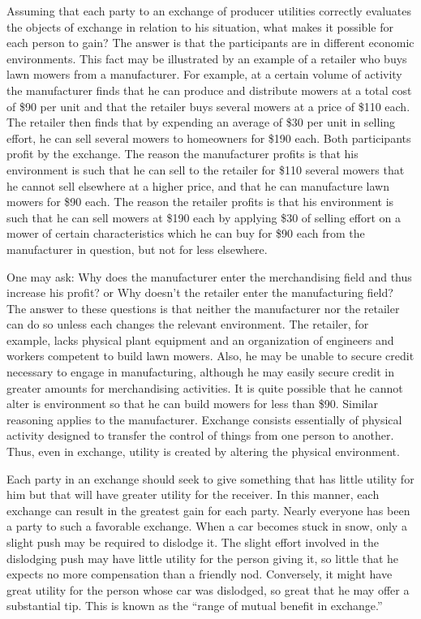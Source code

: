 Assuming that each party to an exchange of producer utilities correctly evaluates the objects of exchange in relation to his situation, what makes it possible for each person to gain?  The answer is that the participants are in different economic environments. This fact may be illustrated by an example of a retailer who buys lawn mowers from a manufacturer. For example, at a certain volume of activity the manufacturer finds that he can produce and distribute mowers at a total cost of \$90 per unit and that the retailer buys several mowers at a price of \$110 each. The retailer then finds that by expending an average of \$30 per unit in selling effort, he can sell several mowers to homeowners for \$190 each. Both participants profit by the exchange. The reason the manufacturer profits is that his environment is such that he can sell to the retailer for \$110 several mowers that he cannot sell elsewhere at a higher price, and that he can manufacture lawn mowers for \$90 each. The reason the retailer profits is that his environment is such that he can sell mowers at \$190 each by applying \$30 of selling effort on a mower of certain characteristics which he can buy for \$90 each from the manufacturer in question, but not for less elsewhere.

One may ask: Why does the manufacturer enter the merchandising field and thus increase his profit? or Why doesn’t the retailer enter the manufacturing field?  The answer to these questions is that neither the manufacturer nor the retailer can do so unless each changes the relevant environment. The retailer, for example, lacks physical plant equipment and an organization of engineers and workers competent to build lawn mowers. Also, he may be unable to secure credit necessary to engage in manufacturing, although he may easily secure credit in greater amounts for merchandising activities. It is quite possible that he cannot alter is environment so that he can build mowers for less than \$90. Similar reasoning applies to the manufacturer. Exchange consists essentially of physical activity designed to transfer the control of things from one person to another. Thus, even in exchange, utility is created by altering the physical environment.

Each party in an exchange should seek to give something that has little utility for him but that will have greater utility for the receiver. In this manner, each exchange can result in the greatest gain for each party. Nearly everyone has been a party to such a favorable exchange. When a car becomes stuck in snow, only a slight push may be required to dislodge it. The slight effort involved in the dislodging push may have little utility for the person giving it, so little that he expects no more compensation than a friendly nod. Conversely, it might have great utility for the person whose car was dislodged, so great that he may offer a substantial tip. This is known as the ``range of mutual benefit in exchange.''

